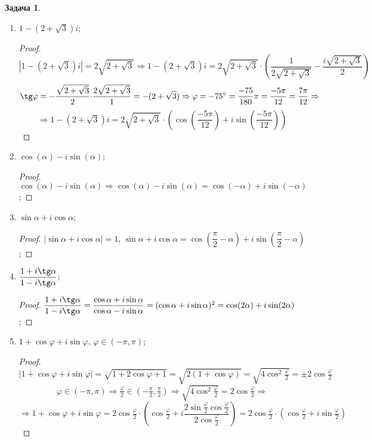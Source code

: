 \documentclass[12pt]{article}
\theoremstyle{definition}
\newtheorem{problem}{Задача}
\begin{document}
\begin{problem}
\begin{enumerate}[label=\asbuk*)]
\begin{proof}
$$			$$
			$$
				\Rightarrow 2 + \sqrt{3} + i = 2\sqrt{2 + \sqrt{3}}{\cdot} \left(\cos\dfrac{\pi}{12} + i\sin\dfrac{\pi}{12}\right)
			$$
		\end{proof}
		\item $1 - (2 + \sqrt{3})i$;
		\begin{proof}
			$$
				|1 - (2 + \sqrt{3})i| =  2\sqrt{2 + \sqrt{3}} \Rightarrow 1 - (2 + \sqrt{3})i = 2\sqrt{2 + \sqrt{3}}{\cdot}\left(\dfrac{1}{2\sqrt{2 + \sqrt{3}}} - \dfrac{i\sqrt{2 + \sqrt{3}}}{2}\right)
			$$
			$$
				\tg\varphi = -\dfrac{\sqrt{2 + \sqrt{3}}}{2}{\cdot}\dfrac{2\sqrt{2 + \sqrt{3}}}{1} = -(2 + \sqrt{3}) \Rightarrow \varphi = -75^{\circ} = \dfrac{-75}{180}\pi = \dfrac{-5\pi}{12} = \dfrac{7\pi}{12} \Rightarrow 
			$$
			$$
				\Rightarrow 1 - (2 + \sqrt{3})i = 2\sqrt{2 + \sqrt{3}}{\cdot}\left(\cos\left(\dfrac{-5\pi}{12}\right) + i\sin\left(\dfrac{-5\pi}{12}\right)\right)
			$$
		\end{proof}
		
		\item $\cos(\alpha) - i\sin(\alpha)$;
		\begin{proof}
			$\cos(\alpha) - i\sin(\alpha) \Rightarrow \cos(\alpha) - i\sin(\alpha) = \cos(-\alpha) + i\sin(-\alpha)$;
		\end{proof}
		\item $\sin\alpha + i \cos\alpha$;
		\begin{proof}
			$|\sin\alpha + i \cos\alpha| = 1, \, \sin\alpha + i \cos\alpha = \cos\left(\dfrac{\pi}{2} - \alpha\right) + i\sin\left(\dfrac{\pi}{2} - \alpha\right)$;
		\end{proof}
		\item $\dfrac{ 1 + i\tg\alpha}{1 - i\tg\alpha}$;
		\begin{proof}
			$\dfrac{ 1 + i\tg\alpha}{1 - i\tg\alpha} = \dfrac{\cos\alpha + i\sin\alpha}{\cos\alpha - i\sin\alpha} = (\cos\alpha + i\sin\alpha)^2 = \cos(2\alpha) + i\sin(2\alpha)$;
		\end{proof}
		\item $1+ \cos\varphi + i\sin\varphi, \, \varphi \in (-\pi, \pi)$;
		\begin{proof}
			$$
				|1+ \cos\varphi + i\sin\varphi| = \sqrt{1 + 2\cos\varphi + 1} = \sqrt{2(1 + \cos\varphi)} = \sqrt{4\cos^2\tfrac{\varphi}{2}} = \pm2\cos\tfrac{\varphi}{2}
			$$
			$$
				\varphi \in (-\pi,\pi) \Rightarrow \tfrac{\varphi}{2} \in \left(-\tfrac{\pi}{2}, \tfrac{\pi}{2}\right) \Rightarrow \sqrt{4\cos^2\tfrac{\varphi}{2}} = 2\cos\tfrac{\varphi}{2} \Rightarrow
			$$
			$$
				\Rightarrow 1+ \cos\varphi + i\sin\varphi = 2\cos\tfrac{\varphi}{2}{\cdot}\left(\cos\tfrac{\varphi}{2} + i \dfrac{2\sin\tfrac{\varphi}{2}\cos\tfrac{\varphi}{2}}{2\cos\tfrac{\varphi}{2}}\right) =2\cos\tfrac{\varphi}{2}{\cdot}\left(\cos\tfrac{\varphi}{2} + i \sin\tfrac{\varphi}{2}\right)
			$$
		\end{proof}
		

\end{enumerate}
\end{problem}
\end{document}
